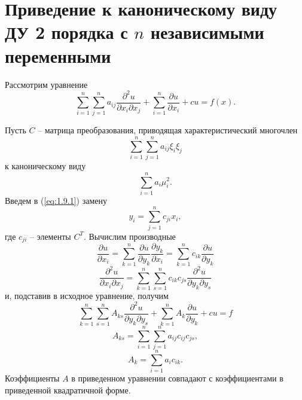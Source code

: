 \documentclass[../main.tex]{subfiles}
\begin{document}
\section{Приведение к каноническому виду ДУ 2 порядка с $n$ независимыми переменными}
Рассмотрим уравнение
\begin{equation}  \label{eq:1.9.1}
	\sum_{i=1}^n\sum_{j=1}^n a_{ij} \frac{\partial^2 u}{\partial x_i \partial x_j} + \sum_{i=1}^n \frac{\partial u}{\partial x_i} + cu = f(x).
\end{equation}

Пусть $C$ -- матрица преобразования, приводящая характеристический многочлен $$\sum_{i=1}^n\sum_{j=1}^n a_{ij} \xi_i \xi_j $$ к каноническому виду
$$\sum_{i=1}^n a_i \mu_i^2.$$
Введем в (\ref{eq:1.9.1}) замену
$$y_i = \sum_{j=1}^n c_{ji}x_i,$$
где $c_{ji}$ -- элементы $C^T$.
Вычислим производные
$$\frac{\partial u}{\partial x_i} = \sum^n_{k=1}\frac{\partial u}{\partial y_k} \frac{\partial y_k}{\partial x_i} = \sum_{k=1}^n c_{ik} \frac{\partial u}{\partial y_k}$$
$$\frac{\partial^2 u}{\partial x_i \partial x_j} = \sum^n_{k=1}\sum^n_{s=1} c_{ik} c_{js} \frac{\partial^2 u}{\partial y_k \partial y_s}$$
и, подставив в исходное уравнение, получим
\begin{equation}
	\boxed{\sum^n_{k=1}\sum^n_{s=1} A_{ks} \frac{\partial^2 u}{\partial y_k \partial y_s} + \sum_{k=1}^n A_k \frac{\partial u}{\partial y_k} + cu = f}
\end{equation}
$$A_{ks} = \sum^n_{i=1}\sum^n_{j=1} a_{ij} c_{ij} c_{js},$$
$$A_k = \sum_{i=1}^n a_i c_{ik}.$$
Коэффициенты $A$ в приведенном уравнении совпадают с коэффициентами в приведенной квадратичной форме.
\end{document}
